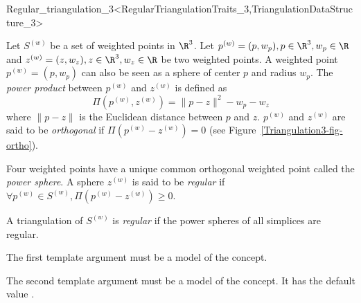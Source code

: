 

\begin{ccRefClass}{Regular_triangulation_3<RegularTriangulationTraits_3,TriangulationDataStructure_3>}

\ccDefinition
  Let ${S}^{(w)}$ be a set of weighted points in $\R^3$. Let
${p}^{(w)}=(p,w_p), p\in\R^3, w_p\in\R$ and 
${z}^{(w)}=(z,w_z), z\in\R^3, w_z\in\R$ be two weighted points. 
A weighted point
${p}^{(w)}=(p,w_p)$ can also be seen as a sphere of center $p$ and
radius $w_p$. 
The \textit{power product} between ${p}^{(w)}$ and ${z}^{(w)}$ is
defined as 
\[\Pi({p}^{(w)},{z}^{(w)}) = {\|{p-z}\|^2-w_p-w_z}\]
where $\|{p-z}\|$ is the Euclidean distance between $p$ and $z$. 
 ${p}^{(w)}$ and ${z}^{(w)}$
are said to be \textit{orthogonal} if $\Pi{({p}^{(w)}-{z}^{(w)})}
= 0$ (see Figure~\ref{Triangulation3-fig-ortho}).

Four weighted points have a unique common orthogonal weighted point called
the \textit{power sphere}. A sphere ${z}^{(w)}$ is said to be
\textit{regular} if $\forall {p}^{(w)}\in{S}^{(w)},
\Pi{({p}^{(w)}-{z}^{(w)})}\geq 0$.

A triangulation of ${S}^{(w)}$ is \textit{regular} if the power spheres
of all simplices are regular. 


\ccParameters

The first template argument must be a model of the
 concept.

The second template argument must be a model of the
 concept.
It has the default value .



\ccTypes
{}


\end{ccRefClass}
